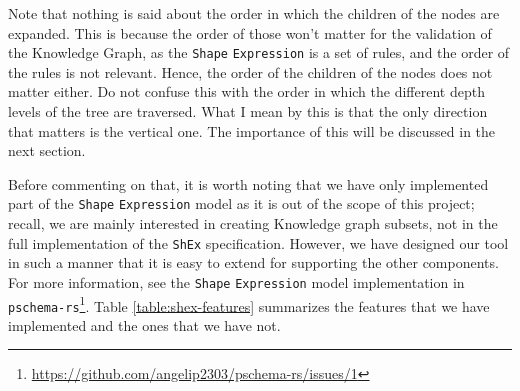 \label{example:shex_tree}

\vspace*{0.5em}

Note that nothing is said about the order in which the children of the nodes are expanded. This is because the order of those won't matter for the validation of the Knowledge Graph, as the \texttt{Shape} \texttt{Expression} is a set of rules, and the order of the rules is not relevant. Hence, the order of the children of the nodes does not matter either. Do not confuse this with the order in which the different depth levels of the tree are traversed. What I mean by this is that the only direction that matters is the vertical one. The importance of this will be discussed in the next section.

Before commenting on that, it is worth noting that we have only implemented part of the \texttt{Shape} \texttt{Expression} model as it is out of the scope of this project; recall, we are mainly interested in creating Knowledge graph subsets, not in the full implementation of the \texttt{ShEx} specification. However, we have designed our tool in such a manner that it is easy to extend for supporting the other components. For more information, see the \texttt{Shape} \texttt{Expression} model implementation in \texttt{pschema-rs}\footnote{\url{https://github.com/angelip2303/pschema-rs/issues/1}}. Table \ref{table:shex-features} summarizes the features that we have implemented and the ones that we have not.

